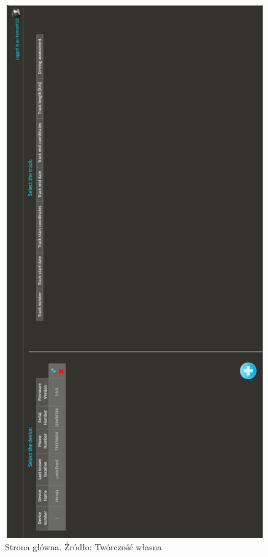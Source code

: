 \begin{figure}[H]
	\centering
	\includegraphics[height=23cm, width=16cm]{img/software/website/main_screen.png}
	\caption{Strona główna. Źródło: Twórczość własna}
	\label{fig:image_soft_website_main_page}
\end{figure}

